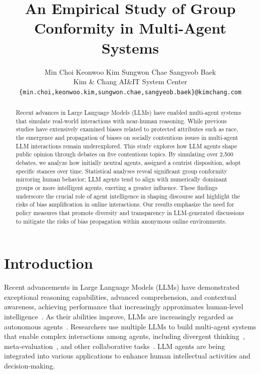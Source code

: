 \documentclass[11pt]{article}
\title{An Empirical Study of Group Conformity in Multi-Agent Systems}
\author{
Min Choi \quad
Keonwoo Kim \quad
Sungwon Chae \quad
Sangyeob Baek \\
Kim \& Chang AI\&IT System Center \\
\texttt{\{min.choi,keonwoo.kim,sungwon.chae,sangyeob.baek\}@kimchang.com}}
\begin{document}
\maketitle
\begin{abstract}

Recent advances in Large Language Models (LLMs) have enabled multi-agent systems that simulate real-world interactions with near-human reasoning. While previous studies have extensively examined biases related to protected attributes such as race, the emergence and propagation of biases on socially contentious issues in multi-agent LLM interactions remain underexplored. This study explores how LLM agents shape public opinion through debates on five contentious topics. By simulating over 2,500 debates, we analyze how initially neutral agents, assigned a centrist disposition, adopt specific stances over time. Statistical analyses reveal significant group conformity mirroring human behavior; LLM agents tend to align with numerically dominant groups or more intelligent agents, exerting a greater influence. These findings underscore the crucial role of agent intelligence in shaping discourse and highlight the risks of bias amplification in online interactions. Our results emphasize the need for policy measures that promote diversity and transparency in LLM-generated discussions to mitigate the risks of bias propagation within anonymous online environments.
\end{abstract}

\section{Introduction} 

Recent advancements in Large Language Models (LLMs) have demonstrated exceptional reasoning capabilities, advanced comprehension, and contextual awareness, achieving performance that increasingly approximates human-level intelligence~\citep{zhao2023survey, achiam2023gpt, team2024gemini, dubey2024llama, guo2025deepseek}. As their abilities improve, LLMs are increasingly regarded as autonomous agents~\citep{xi2023rise, wang2024survey, li2024personal}. Researchers use multiple LLMs to build multi-agent systems that enable complex interactions among agents, including divergent thinking~\citep{liang2023encouraging}, meta-evaluation~\citep{chan2023chateval,kim2024debate}, and other collaborative tasks~\citep{park2023generative, chen2023multi, du2023improving}. LLM agents are being integrated into various applications to enhance human intellectual activities and decision-making.
\end{document}
